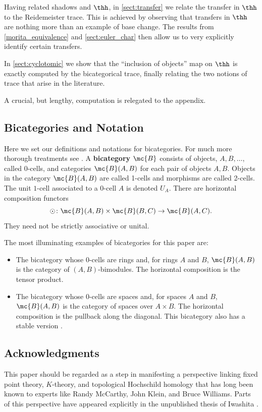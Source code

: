 \documentclass[11pt]{amsart}
\begin{document}
Having related shadows and $\thh$, in \cref{sect:transfer} we relate the transfer in $\thh$ to the Reidemeister trace. This is achieved by observing that transfers in $\thh$ are nothing more than an example of base change. The results from \cref{morita_equivalence} and \cref{sect:euler_char} then allow us to very explicitly identify certain transfers.

In \cref{sect:cyclotomic} we show that the ``inclusion of objects'' map on $\thh$ is exactly computed by the bicategorical trace, finally relating the two notions of trace that arise in the literature. 

A crucial, but lengthy, computation is relegated to the appendix. 


\subsection{Bicategories and Notation}

Here we set our definitions and notations for bicategories. For much more thorough treatments see \cite{benabou,leinster}. 
A {\bf bicategory} $\mc{B}$ consists of objects, $A, B, \ldots$, called $0$-cells,  and categories $\mc{B}(A, B)$ for each pair of objects $A, B$. Objects in the category $\mc{B}(A, B)$ are called 1-cells and morphisms are called 2-cells.  The unit $1$-cell associated to a 0-cell $A$ is denoted $U_A$.
There are horizontal composition functors
\[
\odot \colon  \mc{B}(A, B) \times \mc{B}(B, C) \to \mc{B}(A, C). 
\]
They need not be strictly associative or unital. 


The most illuminating examples of bicategories for this paper are: 
%
\begin{itemize}
  \item The bicategory whose 0-cells are rings and, for rings $A$ and $B$, $\mc{B}(A,B)$ is the category of $(A,B)$-bimodules.  The horizontal composition is the tensor product.
  \item The bicategory whose 0-cells are spaces and, for spaces $A$ and $B$, $\mc{B}(A,B)$ is the category of spaces over $A\times B$.  The  horizontal composition is the pullback 
along the diagonal.  This bicategory also has a stable version \cite{maysig:pht}.
\end{itemize}

\subsection{Acknowledgments} 

This paper should be regarded as a step in manifesting a  perspective linking fixed point theory, $K$-theory, and topological Hochschild homology that has long been known to experts like Randy McCarthy, John Klein, and Bruce Williams. Parts of this perspective have appeared explicitly in the unpublished thesis of Iwashita \cite{iwashita}. 
\end{document}
